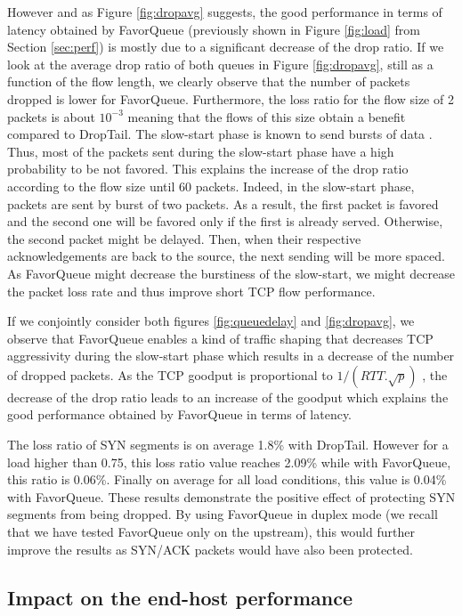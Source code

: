 \documentclass{elsart}
\begin{document}
However and as Figure \ref{fig:dropavg} suggests, the good performance in terms of latency obtained by FavorQueue (previously shown in Figure \ref{fig:load} from Section \ref{sec:perf}) is mostly due to a 
significant decrease of the drop ratio. If we look at the average drop ratio of both queues in Figure \ref{fig:dropavg}, still as a function of the flow length,  
we clearly observe that the number of packets dropped is lower for FavorQueue. Furthermore, the loss ratio for the flow size of 2 packets is about $10^{-3}$ meaning that the flows of this size obtain a benefit compared to DropTail.
The slow-start phase is known to send bursts of data \cite{Barakat00}. Thus, most of the packets sent during the slow-start phase have a high probability to be not favored. This explains the increase of the drop ratio according 
to the flow size until 60 packets.
Indeed, in the slow-start phase, packets are sent by burst of two packets. As a result, the first packet is favored and the second
one will be favored only if the first is already served. Otherwise, the second packet might be delayed. Then, when their respective acknowledgements are back to the source, the next sending will be more spaced. 
As FavorQueue might decrease the burstiness of the slow-start, we might decrease the packet loss rate and thus improve short TCP flow performance.

If we conjointly consider both figures \ref{fig:queuedelay} and \ref{fig:dropavg}, we observe that FavorQueue enables a kind of traffic shaping that decreases TCP aggressivity during the slow-start phase which results in a 
decrease of the number of dropped packets. As the TCP goodput is proportional to $1/(RTT.\sqrt{p})$ \cite{mathis97macroscopic}, the decrease of the drop ratio leads to an increase of the goodput which explains the good 
performance obtained by FavorQueue in terms of latency.

The loss ratio of SYN segments is on average 1.8\% with DropTail. However for a load higher than 0.75, this loss ratio value reaches 2.09\% while with FavorQueue, this ratio is 0.06\%. Finally on average for all load conditions, this value is 0.04\% with FavorQueue. These results demonstrate the positive effect of protecting SYN segments from being dropped. By using FavorQueue in duplex mode (we recall that we have tested FavorQueue only on the upstream), this would further improve the results as SYN/ACK packets would have also been protected.


\subsection{Impact on the end-host performance}
\end{document}
